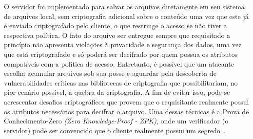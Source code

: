 \documentclass[a4paper,11pt]{article}
\begin{document}

O servidor foi implementado para salvar os arquivos diretamente em seu sistema de arquivos local, sem criptografia adicional sobre o conteúdo uma vez que este já é enviado criptografado pelo cliente, o que restringe o acesso se não tiver a respectiva política.
O fato do arquivo ser entregue sempre que requisitado a princípio não apresenta violações à privacidade e segurança dos dados, uma vez que está criptografado e só poderá ser decifrado por quem possua os atributos compatíveis com a política de acesso.
Entretanto, é possível que um atacante escolha acumular arquivos sob sua posse e aguardar pela descoberta de vulnerabilidades críticas nas bibliotecas de criptografia que possibilitariam, no pior cenário possível, a quebra da criptografia.
A fim de evitar isso, pode-se acrescentar desafios criptográficos que provem que o requisitante realmente possui os atributos necessários para decifrar o arquivo.
Uma dessas técnicas é a Prova de Conhecimento-Zero \emph{(Zero Knowledge-Proof - ZPK)}, onde um verificador (o servidor) pode ser convencido que o cliente realmente possui um segredo~\cite{Rice2010,Buchanan2017}.

\end{document}
